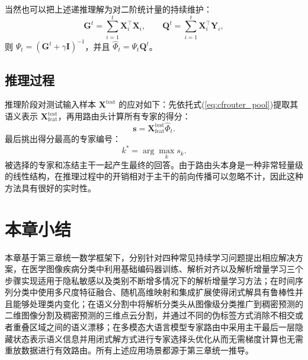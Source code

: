 当然也可以把上述递推理解为对二阶统计量的持续维护：
\begin{equation}
\mathbf{G}^{t}=\sum_{i=1}^{t}\mathbf{X}_i^{\top}\mathbf{X}_i,
\qquad
\mathbf{Q}^{t}=\sum_{i=1}^{t}\mathbf{X}_i^{\top}\mathbf{Y}_i,
\end{equation}
则 $\Psi_t=(\mathbf{G}^{t}+\gamma\mathbf{I})^{-1}$，并且 $\widehat{\Phi}_t=\Psi_t\mathbf{Q}^{t}$。

\subsection{推理过程}

推理阶段对测试输入样本 $\mathbf{X}^{\mathrm{test}}$ 的应对如下：先依托式(\ref{eq:cfrouter_pool})提取其语义表示 $\mathbf{X}_{\mathrm{feat}}^{\mathrm{test}}$，再用路由头计算所有专家的得分：
\begin{equation}
\mathbf{s}=\mathbf{X}_{\mathrm{feat}}^{\mathrm{test}}\widehat{\Phi}_t.
\end{equation}
最后挑出得分最高的专家编号：
\begin{equation}
k^*=\arg\max_k s_k.
\end{equation}
被选择的专家和冻结主干一起产生最终的回答。由于路由头本身是一种非常轻量级的线性结构，在推理过程中的开销相对于主干的前向传播可以忽略不计，因此这种方法具有很好的实时性。

\section{本章小结}

本章基于第三章统一数学框架下，分别针对四种常见持续学习问题提出相应解决方案，在医学图像疾病分类中利用基础编码器训练、解析对齐以及解析增量学习三个步骤实现适用于隐私敏感以及类别不断增多情况下的解析增量学习方法；在时间序列分类中使用多尺度特征融合、随机高维映射和集成扩展使得闭式解具有鲁棒性并且能够处理类内变化；在语义分割中将解析分类头从图像级分类推广到稠密预测的二维图像分割及稠密预测的三维点云分割，并通过不同的伪标签方式消除不相交或者重叠区域之间的语义漂移；在多模态大语言模型专家路由中采用主干最后一层隐藏状态表示语义信息并用闭式解方式进行专家选择头优化从而无需梯度计算也无需重放数据进行有效路由。所有上述应用场景都源于第三章统一推导。
